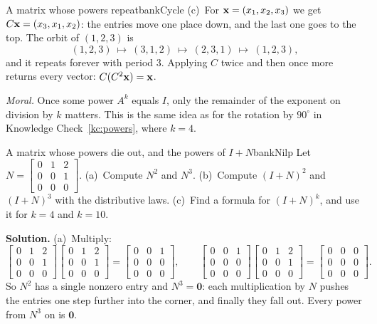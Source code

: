\documentclass[11pt]{article}
\begin{document}
\begin{exmp}{A matrix whose powers repeat}{bankCycle}
(c)~For $\mathbf{x}=(x_1,x_2,x_3)$ we get $C\mathbf{x}=(x_3,x_1,x_2)$: the entries move one place down, and the last one goes to the top. The orbit of $(1,2,3)$ is
\[
(1,2,3)\ \longmapsto\ (3,1,2)\ \longmapsto\ (2,3,1)\ \longmapsto\ (1,2,3),
\]
and it repeats forever with period $3$. Applying $C$ twice and then once more returns every vector: $C(C^2\mathbf{x})=\mathbf{x}$.

\emph{Moral.} Once some power $A^k$ equals $I$, only the remainder of the exponent on division by $k$ matters. This is the same idea as for the rotation by $90^\circ$ in Knowledge Check~\ref{kc:powers}, where $k=4$.
\end{exmp}

\begin{exmp}{A matrix whose powers die out, and the powers of $I+N$}{bankNilp}
Let $N=\begin{bmatrix}0&1&2\\0&0&1\\0&0&0\end{bmatrix}$. (a)~Compute $N^2$ and $N^3$. (b)~Compute $(I+N)^2$ and $(I+N)^3$ with the distributive laws. (c)~Find a formula for $(I+N)^k$, and use it for $k=4$ and $k=10$.

\textbf{Solution.} (a)~Multiply:
\[
\begin{bmatrix}0&1&2\\0&0&1\\0&0&0\end{bmatrix}\begin{bmatrix}0&1&2\\0&0&1\\0&0&0\end{bmatrix}=\begin{bmatrix}0&0&1\\0&0&0\\0&0&0\end{bmatrix},\qquad
\begin{bmatrix}0&0&1\\0&0&0\\0&0&0\end{bmatrix}\begin{bmatrix}0&1&2\\0&0&1\\0&0&0\end{bmatrix}=\begin{bmatrix}0&0&0\\0&0&0\\0&0&0\end{bmatrix}.
\]
So $N^2$ has a single nonzero entry and $N^3=\mathbf{0}$: each multiplication by $N$ pushes the entries one step further into the corner, and finally they fall out. Every power from $N^3$ on is $\mathbf{0}$.


\end{exmp}
\end{document}
